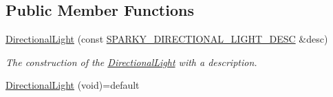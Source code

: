 \subsection*{Public Member Functions}
\begin{DoxyCompactItemize}
\item 
\hyperlink{classsparky_1_1_directional_light_a48e40264ca934395bb59f7273133d5c6}{Directional\+Light} (const \hyperlink{structsparky_1_1_s_p_a_r_k_y___d_i_r_e_c_t_i_o_n_a_l___l_i_g_h_t___d_e_s_c}{S\+P\+A\+R\+K\+Y\+\_\+\+D\+I\+R\+E\+C\+T\+I\+O\+N\+A\+L\+\_\+\+L\+I\+G\+H\+T\+\_\+\+D\+E\+SC} \&desc)
\begin{DoxyCompactList}\small\item\em The construction of the \hyperlink{classsparky_1_1_directional_light}{Directional\+Light} with a description. \end{DoxyCompactList}\item 
\hyperlink{classsparky_1_1_directional_light_a3078c7277827fc0a2a794b3c9b12db0f}{Directional\+Light} (void)=default\hypertarget{classsparky_1_1_directional_light_a3078c7277827fc0a2a794b3c9b12db0f}{}\label{classsparky_1_1_directional_light_a3078c7277827fc0a2a794b3c9b12db0f}


\end{DoxyCompactItemize}

